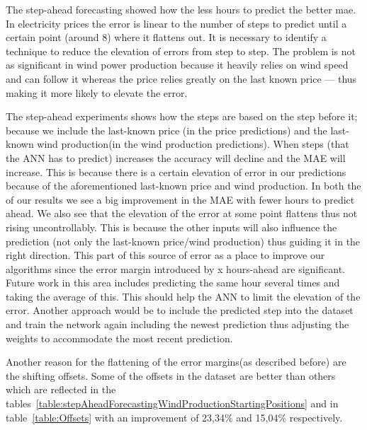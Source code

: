 The step-ahead forecasting showed how the less hours to predict the better mae. In electricity prices the error is linear to the number of steps to predict until a certain point (around 8) where it flattens out. It is necessary to identify a technique to reduce the elevation of errors from step to step. The problem is not as significant in wind power production because it heavily relies on wind speed and can follow it whereas the price relies greatly on the last known price --- thus making it more likely to elevate the error. 

The step-ahead experiments shows how the steps are based on the step before it; because we include the last-known price (in the price predictions) and the last-known wind production(in the wind production predictions). When steps (that the ANN has to predict) increases the accuracy will decline and the MAE will increase. This is because there is a certain elevation of error in our predictions because of the aforementioned last-known price and wind production. In both the of our results we see a big improvement in the MAE with fewer hours to predict ahead. We also see that the elevation of the error at some point flattens thus not rising uncontrollably. This is because the other inputs will also influence the prediction (not only the last-known price/wind production) thus guiding it in the right direction. This part of this source of error as a place to improve our algorithms since the error margin introduced by x hours-ahead are significant. Future work in this area includes predicting the same hour several times and taking the average of this. This should help the ANN to limit the elevation of the error. Another approach would be to include the predicted step into the dataset and train the network again including the newest prediction thus adjusting the weights to accommodate the most recent prediction.

Another reason for the flattening of the error margins(as described before) are the shifting offsets. Some of the offsets in the dataset are better than others which are reflected in the tables~\ref{table:stepAheadForecastingWindProductionStartingPositions} and in table~\ref{table:Offsets} with an improvement of 23,34\% and 15,04\% respectively. 
